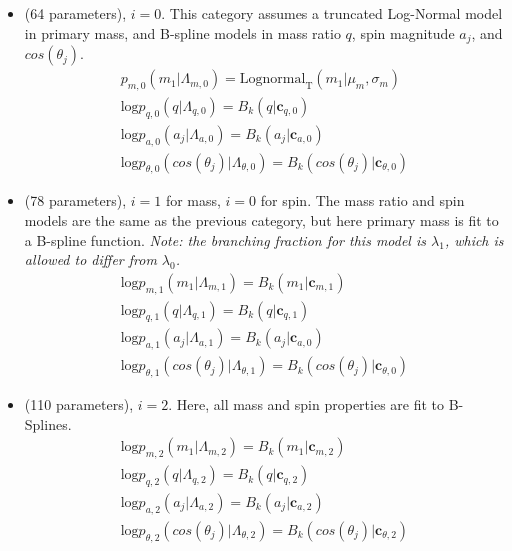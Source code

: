 \begin{itemize}
    \item \first{} (64 parameters), $i=0$. This category assumes a truncated Log-Normal model in primary mass, and B-spline models in mass ratio $q$, spin magnitude $a_j$, and $cos(\theta_{j})$. 
    \begin{eqnarray} \label{eq:peakAcomp}
        p_{m,0}(m_1| \Lambda_{m,0}) = \text{Lognormal}_\text{T}(m_1 | \mu_{m}, \sigma_{m}) \\
        \text{log} p_{q,0}(q| \Lambda_{q,0}) = B_k(q | \mathbf{c}_{q,0}) \\
        \text{log} p_{a,0}(a_j| \Lambda_{a,0}) = B_k(a_j | \mathbf{c}_{a,0}) \\
        \text{log} p_{\theta,0}(cos(\theta_j)| \Lambda_{\theta,0}) = B_k( cos(\theta_j) | \mathbf{c}_{\theta,0})
    \end{eqnarray}

    \item \contA{} (78 parameters), $i=1$ for mass, $i = 0$ for spin. The mass ratio and spin models are the same as the previous category, but here primary mass is fit to a B-spline function. \textit{Note: the branching fraction for this model is $\lambda_1$, which is allowed to differ from $\lambda_0$.}
    \begin{eqnarray} \label{eq:contAcomp}
        \text{log} p_{m,1}(m_1| \Lambda_{m,1}) = B_k(m_1 | \mathbf{c}_{m, 1}) \\
        \text{log} p_{q,1}(q| \Lambda_{q,1}) = B_k(q | \mathbf{c}_{q,1}) \\
        \text{log} p_{a,1}(a_j| \Lambda_{a,1}) = B_k(a_j | \mathbf{c}_{a,0}) \\
        \text{log} p_{\theta,1}(cos(\theta_j)| \Lambda_{\theta,1}) = B_k( cos(\theta_j) | \mathbf{c}_{\theta,0})
    \end{eqnarray}

    \item \contB{} (110 parameters), $i=2$. Here, all mass and spin properties are fit to B-Splines.
    \begin{eqnarray} \label{eq:contBcomp}
        \text{log} p_{m,2}(m_1| \Lambda_{m,2}) = B_k(m_1 | \mathbf{c}_{m, 2}) \\
        \text{log} p_{q,2}(q| \Lambda_{q,2}) = B_k(q | \mathbf{c}_{q,2}) \\
        \text{log} p_{a,2}(a_j| \Lambda_{a,2}) = B_k(a_j | \mathbf{c}_{a,2}) \\
        \text{log} p_{\theta,2}(cos(\theta_j)| \Lambda_{\theta,2}) = B_k( cos(\theta_j) | \mathbf{c}_{\theta,2})
    \end{eqnarray}
\end{itemize}